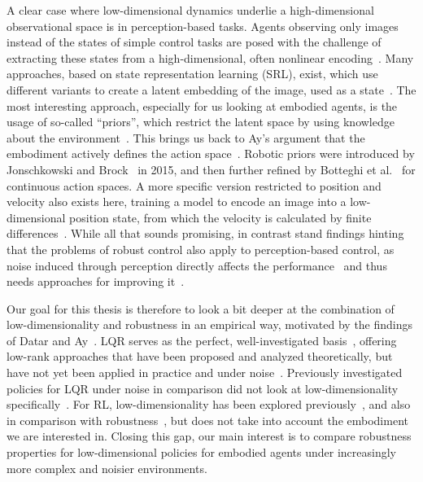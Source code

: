 A clear case where low-dimensional dynamics underlie a high-dimensional observational space is in perception-based tasks.
Agents observing only images instead of the states of simple control tasks are posed with the challenge of extracting
these states from a high-dimensional, often nonlinear encoding~\cite[Sec.~1]{Watter2015Embed}. Many approaches, based on
state representation learning (SRL), exist, which use different variants to create a latent embedding of the image,
used as a state~\cite{Lesort2018State}. The most interesting approach, especially for us looking at embodied agents, is
the usage of so-called ``priors'', which restrict the latent space by using knowledge about the
environment~\cite{Lesort2018State}.
This brings us back to Ay's argument that the embodiment actively defines the action space~\cite{Ay2015Geometric}.
Robotic priors were introduced by Jonschkowski and Brock~\cite{Jonschkowski2015Learning} in 2015, and then further
refined by Botteghi et al.~\cite{Botteghi2021LowDimensional} for continuous action spaces. A more specific version
restricted to position and velocity also exists here, training a model to encode an image into a low-dimensional
position state, from which the velocity is calculated by finite differences~\cite{Jonschkowski2017PVE}.
While all that sounds promising, in contrast stand findings hinting that the problems of robust control
also apply to perception-based control, as noise induced through perception directly affects
the performance~\cite{Xu2021Perception} and thus needs approaches for improving
it~\cite{Dean2020Robust}.

Our goal for this thesis is therefore to look a bit deeper at the combination of low-dimensionality
and robustness in an empirical way, motivated by the findings of Datar and Ay~\cite{Datar2025Universal}. LQR
serves as the perfect, well-investigated basis~\cite{Recht2019Tour}, offering low-rank approaches that have been proposed
and analyzed theoretically, but have not yet been applied in practice and under noise~\cite{Park2020Structured}. Previously
investigated policies for LQR under noise in comparison did not look at low-dimensionality
specifically~\cite{Zhang2021Policy}.
For RL, low-dimensionality has been explored
previously~\cite{Agarwal2020FLAMBE,Stojanovic2024ModelFree}, and also
in comparison with robustness~\cite{Li2025AdaRL}, but does not take into account the embodiment we are interested in.
Closing this gap, our main interest is to compare robustness properties for low-dimensional policies for embodied
agents under increasingly more complex and noisier environments.

